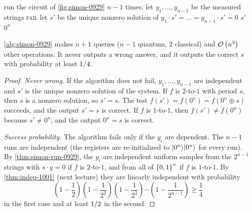\begin{algorithm}[ht]
    \caption{Simon's algorithm}
    \label{alg:simon-0929}
    \begin{algorithmic}[1]
        \State run the circuit of \cref{fig:simon-0929} $n - 1$ times; let $y_1, \dots, y_{n-1}$ be the measured strings
         
        \State \Return \textsc{fail}
        \EndIf
        \State let $s'$ be the unique nonzero solution of $y_1 \cdot s' = \dots = y_{n-1} \cdot s' = 0$
         
        \State \Return $s'$ 
        \Else
        \State \Return $0^n$ 
        \EndIf
    \end{algorithmic}
\end{algorithm}

\begin{theorem}\label{thm:simon-0929}
    \cref{alg:simon-0929} makes $n + 1$ queries ($n - 1$ quantum, $2$ classical) and $\mathcal{O}\left(n^3\right)$ other
    operations. It never outputs a wrong answer, and it outputs the correct $s$ with probability at least
    $1/4$.
\end{theorem}

\begin{proof}
    \emph{Never wrong.} If the algorithm does not fail, $y_1, \dots, y_{n-1}$ are independent and $s'$
    is the unique nonzero solution of the system. If $f$ is $2$-to-$1$ with period $s$, then $s$ is a
    nonzero solution, so $s' = s$. The test $f(s') = f(0^n) = f(0^n \oplus s)$ succeeds, and the output
    $s' = s$ is correct. If $f$ is $1$-to-$1$, then $f(s') \neq f(0^n)$ because $s' \neq 0^n$, and the
    output $0^n = s$ is correct.

    \emph{Success probability.} The algorithm fails only if the $y_i$ are dependent. The $n - 1$ runs are
    independent (the registers are re-initialized to $\lvert 0^n \rangle\lvert 0^n \rangle$ for every run). By
    \cref{thm:simon-run-0929}, the $y_i$ are independent uniform samples from the $2^{n-1}$ strings with
    $s \cdot y = 0$ if $f$ is $2$-to-$1$, and from all of $\left\lbrace0,1\right\rbrace^n$ if $f$ is $1$-to-$1$. By
    \cref{thm:indep-1001} (next lecture) they are linearly independent with probability
    \[\left(1 - \frac{1}{2}\right)\left(1 - \frac{1}{2^2}\right)\left(1 - \frac{1}{2^3}\right) \cdots \left(1 - \frac{1}{2^{n-1}}\right) \geq \frac{1}{4}\]
    in the first case and at least $1/2$ in the second.
\end{proof}

